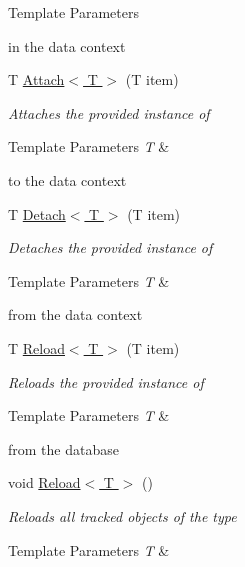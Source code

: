 \begin{DoxyCompactItemize}
\begin{DoxyCompactList}
\begin{DoxyTemplParams}{Template Parameters}
\hline
\end{DoxyTemplParams}
in the data context \end{DoxyCompactList}\item 
T \hyperlink{interface_highway_1_1_data_1_1_interfaces_1_1_i_data_context_a404ee46e3152c5a80a7ad7a999a5f302}{Attach$<$ T $>$} (T item)
\begin{DoxyCompactList}\small\item\em Attaches the provided instance of 
\begin{DoxyTemplParams}{Template Parameters}
{\em T} & \\
\hline
\end{DoxyTemplParams}
to the data context \end{DoxyCompactList}\item 
T \hyperlink{interface_highway_1_1_data_1_1_interfaces_1_1_i_data_context_a88434616ba2c8b719d31e76554babfc0}{Detach$<$ T $>$} (T item)
\begin{DoxyCompactList}\small\item\em Detaches the provided instance of 
\begin{DoxyTemplParams}{Template Parameters}
{\em T} & \\
\hline
\end{DoxyTemplParams}
from the data context \end{DoxyCompactList}\item 
T \hyperlink{interface_highway_1_1_data_1_1_interfaces_1_1_i_data_context_ac56bd7fbcb297fd6d0deb0edafe057df}{Reload$<$ T $>$} (T item)
\begin{DoxyCompactList}\small\item\em Reloads the provided instance of 
\begin{DoxyTemplParams}{Template Parameters}
{\em T} & \\
\hline
\end{DoxyTemplParams}
from the database \end{DoxyCompactList}\item 
void \hyperlink{interface_highway_1_1_data_1_1_interfaces_1_1_i_data_context_a8b5557c0e54d1447d2f8a8e68bf4e1f0}{Reload$<$ T $>$} ()
\begin{DoxyCompactList}\small\item\em Reloads all tracked objects of the type 
\begin{DoxyTemplParams}{Template Parameters}
{\em T} & \\
\hline
\end{DoxyTemplParams}
\end{DoxyCompactList}\item 

\end{DoxyCompactItemize}
